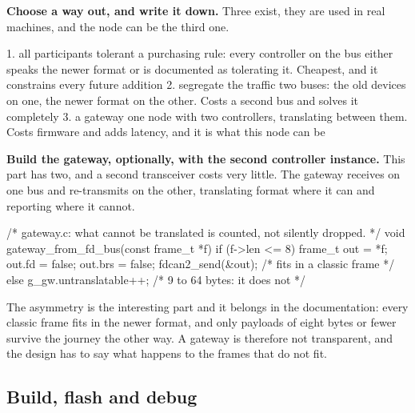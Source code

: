 \begin{steps}
\item \textbf{Choose a way out, and write it down.} Three exist, they are used
in real machines, and the node can be the third one.
\begin{plaincode}
1. all participants tolerant   a purchasing rule: every controller on the bus
                               either speaks the newer format or is documented
                               as tolerating it. Cheapest, and it constrains
                               every future addition
2. segregate the traffic       two buses: the old devices on one, the newer
                               format on the other. Costs a second bus and
                               solves it completely
3. a gateway                   one node with two controllers, translating
                               between them. Costs firmware and adds latency,
                               and it is what this node can be
\end{plaincode}

\item \textbf{Build the gateway, optionally, with the second controller
instance.} This part has two, and a second transceiver costs very little. The
gateway receives on one bus and re-transmits on the other, translating format
where it can and reporting where it cannot.
\begin{ccode}
/* gateway.c: what cannot be translated is counted, not silently dropped. */
void gateway_from_fd_bus(const frame_t *f)
{
    if (f->len <= 8) {
        frame_t out = *f; out.fd = false; out.brs = false;
        fdcan2_send(&out);                    /* fits in a classic frame */
    } else {
        g_gw.untranslatable++;                /* 9 to 64 bytes: it does not */
    }
}
\end{ccode}
The asymmetry is the interesting part and it belongs in the documentation: every
classic frame fits in the newer format, and only payloads of eight bytes or
fewer survive the journey the other way. A gateway is therefore not transparent,
and the design has to say what happens to the frames that do not fit.
\end{steps}

\subsection*{Build, flash and debug}


